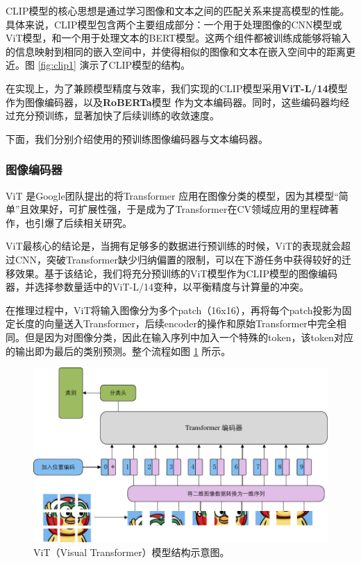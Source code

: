 \documentclass[a4paper]{zreport}
\begin{document}
CLIP模型的核心思想是通过学习图像和文本之间的匹配关系来提高模型的性能。具体来说，CLIP模型包含两个主要组成部分：一个用于处理图像的CNN模型或ViT模型，和一个用于处理文本的BERT模型。这两个组件都被训练成能够将输入的信息映射到相同的嵌入空间中，并使得相似的图像和文本在嵌入空间中的距离更近。图 \ref{fig:clip1} 演示了CLIP模型的结构。

在实现上，为了兼顾模型精度与效率，我们实现的CLIP模型采用\textbf{ViT-L/14}模型作为图像编码器，以及\textbf{RoBERTa}模型
作为文本编码器。同时，这些编码器均经过充分预训练，显著加快了后续训练的收敛速度。

下面，我们分别介绍使用的预训练图像编码器与文本编码器。

\subsubsection{图像编码器}

ViT \cite{dosovitskiy2020image} 是Google团队提出的将Transformer \cite{vaswani2017attention} 应用在图像分类的模型，因为其模型“简单”且效果好，可扩展性强，于是成为了Transformer在CV领域应用的里程碑著作，也引爆了后续相关研究。

ViT最核心的结论是，当拥有足够多的数据进行预训练的时候，ViT的表现就会超过CNN，突破Transformer缺少归纳偏置的限制，可以在下游任务中获得较好的迁移效果。基于该结论，我们将充分预训练的ViT模型作为CLIP模型的图像编码器，并选择参数量适中的ViT-L/14变种，以平衡精度与计算量的冲突。

在推理过程中，ViT将输入图像分为多个patch（16x16），再将每个patch投影为固定长度的向量送入Transformer，后续encoder的操作和原始Transformer中完全相同。但是因为对图像分类，因此在输入序列中加入一个特殊的token，该token对应的输出即为最后的类别预测。整个流程如图 \ref{fig:vit} 所示。

\begin{figure}[h]
\centering
\includegraphics[width=0.9\linewidth]{figures/vit}
\caption{ViT（Visual Transformer）模型结构示意图。}
\label{fig:vit}
\end{figure}
\end{document}
